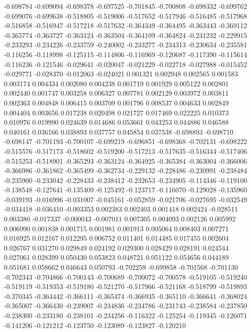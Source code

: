 -0.698784
-0.699094
-0.698378
-0.697525
-0.701845
-0.700808
-0.698332
-0.699762
-0.699076
-0.699638
-0.518805
-0.519006
-0.517652
-0.517946
-0.516485
-0.517968
-0.516858
-0.516947
-0.517218
-0.517632
-0.364349
-0.364495
-0.363443
-0.369112
-0.365774
-0.363727
-0.363124
-0.363504
-0.364109
-0.364824
-0.231232
-0.229915
-0.233293
-0.234226
-0.233759
-0.240002
-0.233277
-0.234313
-0.230634
-0.235581
-0.116256
-0.118998
-0.125115
-0.114806
-0.116969
-0.120687
-0.117390
-0.115614
-0.116236
-0.121546
-0.029641
-0.020047
-0.021229
-0.022718
-0.027988
-0.015452
-0.029771
-0.028370
-0.012063
-0.024021
0.001321
0.002948
0.002565
0.001583
0.003174
0.004334
0.002080
0.004238
0.001719
0.001929
0.005122
0.002801
0.002440
0.001747
0.003258
0.006327
0.007781
0.002129
0.003972
0.003811
0.002363
0.004848
0.006415
0.003709
0.001796
0.008537
0.004633
0.002849
0.004404
0.003656
0.017238
0.020498
0.021727
0.017469
0.022225
0.010373
0.010976
0.019990
0.024639
0.014686
0.053661
0.043253
0.044886
0.046588
0.040161
0.036166
0.038893
0.037757
0.045854
0.037538
-0.698893
-0.698710
-0.698147
-0.701193
-0.700107
-0.699219
-0.696851
-0.698368
-0.702131
-0.698222
-0.515576
-0.517173
-0.518602
-0.519200
-0.517213
-0.517635
-0.516344
-0.517406
-0.515253
-0.518901
-0.365293
-0.363124
-0.364925
-0.365384
-0.363004
-0.366006
-0.366986
-0.361862
-0.365499
-0.362734
-0.229132
-0.228486
-0.230991
-0.238484
-0.235900
-0.233042
-0.228433
-0.238412
-0.232653
-0.234905
-0.114346
-0.119100
-0.138548
-0.127641
-0.135409
-0.125492
-0.123717
-0.116070
-0.129028
-0.135960
-0.039193
-0.016996
-0.031007
-0.045161
-0.052859
-0.021706
-0.027695
-0.032549
-0.034418
-0.036410
-0.003353
0.002383
0.002403
0.001418
0.002424
-0.028511
0.003380
-0.017337
-0.000043
-0.007011
0.007305
0.004093
0.002126
0.005992
0.006990
0.001838
0.001715
0.001981
0.001913
0.005064
0.008403
0.007271
0.016925
0.012167
0.012295
0.006752
0.011401
0.014485
0.017455
0.002604
0.026767
0.031270
0.029849
0.024192
0.029300
0.028429
0.028191
0.024544
0.027061
0.028399
0.050430
0.053823
0.048721
0.051122
0.054656
0.044189
0.051681
0.058662
0.046643
0.050793
-0.702259
-0.699858
-0.701568
-0.701130
-0.702343
-0.704866
-0.700143
-0.700689
-0.700072
-0.700578
-0.519105
-0.519240
-0.519119
-0.519353
-0.519180
-0.521270
-0.517966
-0.521168
-0.518799
-0.519893
-0.370345
-0.364442
-0.366111
-0.365474
-0.366935
-0.365110
-0.366641
-0.368024
-0.365007
-0.366430
-0.239007
-0.234836
-0.234786
-0.231743
-0.238584
-0.237850
-0.238300
-0.233180
-0.238101
-0.234256
-0.116322
-0.125254
-0.119345
-0.126071
-0.141206
-0.121212
-0.123750
-0.123089
-0.123827
-0.120210
